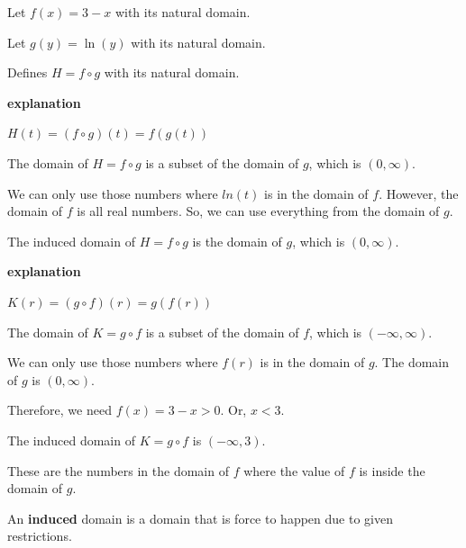\documentclass{ximera}
\begin{document}
\begin{example}


Let $f(x) = 3 - x$ with its natural domain.


Let $g(y) = \ln(y)$ with its natural domain.


Defines $H = f \circ g$ with its natural domain.



\textbf{\textcolor{red!75!green}{explanation}} 


$H(t) = (f \circ g)(t) = f(g(t))$


The domain of $H = f \circ g$ is a subset of the domain of $g$, which is $(0, \infty)$.  

We can only use those numbers where $ln(t)$ is in the domain of $f$.  However, the domain of $f$ is all real numbers.  So, we can use everything from the domain of $g$.

The induced domain of $H = f \circ g$ is the domain of $g$, which is $(0, \infty)$. 












\textbf{\textcolor{red!75!green}{explanation}} 


$K(r) = (g \circ f)(r) = g(f(r))$


The domain of $K = g \circ f$ is a subset of the domain of $f$, which is $(-\infty, \infty)$.  

We can only use those numbers where $f(r)$ is in the domain of $g$.  The domain of $g$ is $(0, \infty)$.  

Therefore, we need $f(x) = 3 - x > 0$.  Or, $x < 3$.

The induced domain of $K = g \circ f$ is $(-\infty, 3)$. 

These are the numbers in the domain of $f$ where the value of $f$ is inside the domain of $g$.






\end{example}


An \textbf{induced} domain is a domain that is force to happen due to given restrictions. 
\end{document}
